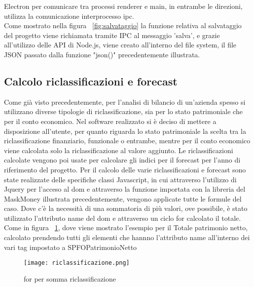 Electron per comunicare tra processi renderer e main, in entrambe le direzioni, utilizza la comunicazione interprocesso \Gls{ipc}.\\  Come mostrato nella figura ~\ref{fig:salvataggio} la funzione relativa al salvataggio del progetto viene richiamata tramite IPC al messaggio 'salva', e grazie all'utilizzo delle API di Node.js, viene creato all'interno del file system, il file JSON passato dalla funzione "json()" precedentemente illustrata.



\newpage

\subsection {Calcolo riclassificazioni e forecast}

Come già visto precedentemente, per l'analisi di bilancio di un'azienda spesso si utilizzano diverse tipologie di riclassificazione, sia per lo stato patrimoniale che per il conto economico. Nel software realizzato si è deciso di mettere a disposizione all'utente, per quanto riguarda lo stato patrimoniale la scelta tra la riclassificazione finanziario, funzionale o entrambe, mentre per il conto economico viene calcolata solo la riclassificazione al valore aggiunto.
Le riclassificazioni calcolate vengono poi usate per calcolare gli indici per il forecast per l'anno di riferimento del progetto.
Per il calcolo delle varie riclassificazioni e forecast sono state realizzate delle specifiche classi Javascript, in cui attraverso l'utilizzo di Jquery per l'acceso al \Gls{dom} e attraverso la funzione importata con la libreria del MaskMoney illustrata precedentemente, vengono applicate tutte le formule del caso.
Dove c'è la necessità di una sommatoria di più valori, ove possibile, è stato utilizzato l'attributo name del \Gls{dom} e attraverso un ciclo for calcolato il totale. Come in figura ~\ref{fig:riclassificazione}, dove viene mostrato l'esempio per il Totale patrimonio netto, calcolato prendendo tutti gli elementi che hannno l'attributo name all'interno dei vari tag impostato a SPFOPatrimonioNetto \\


\begin{figure}[H]
    \centering
    \texttt{[image: riclassificazione.png]}
    \caption{for per somma riclassificazione}
    \label{fig:riclassificazione}
\end{figure}

\newpage

